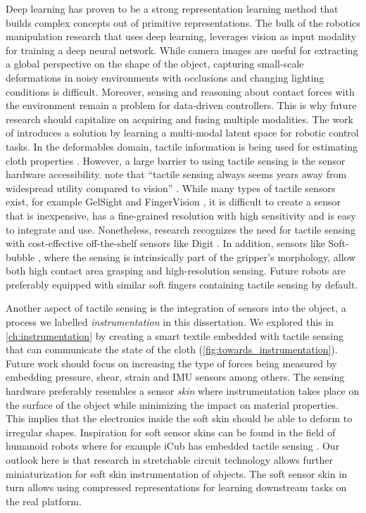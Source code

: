 \documentclass[\home/main.tex]{subfiles}
\begin{document}
Deep learning has proven to be a strong representation learning method that builds complex concepts out of primitive representations. The bulk of the robotics manipulation research that uses deep learning, leverages vision as input modality for training a deep neural network. While camera images are useful for extracting a global perspective on the shape of the object, capturing small-scale deformations in noisy environments with occlusions and changing lighting conditions is difficult. Moreover, sensing and reasoning about contact forces with the environment remain a problem for data-driven controllers. This is why future research should capitalize on acquiring and fusing multiple modalities. The work of \autocite{lee2020making} introduces a solution by learning a multi-modal latent space for robotic control tasks. In the deformables domain, tactile information is being used for estimating cloth properties \autocite{yuan2018active}. However, a large barrier to using tactile sensing is the sensor hardware accessibility. \citeauthor{Siciliano2008} note that \enquote{tactile sensing always seems years away from widespread utility compared to vision} \autocite{Siciliano2008}. While many types of tactile sensors exist, for example GelSight \autocite{donlon2018gelslim} and FingerVision \autocite{Yamaguchi2017}, it is difficult to create a sensor that is inexpensive, has a fine-grained resolution with high sensitivity and is easy to integrate and use. Nonetheless, research recognizes the need for tactile sensing with cost-effective off-the-shelf sensors like Digit \autocite{digit2020}. In addition, sensors like Soft-bubble \autocite{Alspach2019}, where the sensing is intrinsically part of the gripper's morphology, allow both high contact area grasping and high-resolution sensing. Future robots are preferably equipped with similar soft fingers containing tactile sensing by default.

Another aspect of tactile sensing is the integration of sensors into the object, a process we labelled \textit{instrumentation} in this dissertation.
We explored this in \cref{ch:instrumentation} by creating a smart textile embedded with tactile sensing that can communicate the state of the cloth (\cref{fig:towards_instrumentation}). Future work should focus on increasing the type of forces being measured by embedding pressure, shear, strain and IMU sensors among others. The sensing hardware preferably resembles a sensor \emph{skin} where instrumentation takes place on the surface of the object while minimizing the impact on material properties. This implies that the electronics inside the soft skin should be able to deform to irregular shapes. Inspiration for soft sensor skins can be found in the field of humanoid robots where for example iCub has embedded tactile sensing \autocite{Tomo2018}. Our outlook here is that research in stretchable circuit technology allows further miniaturization for soft skin instrumentation of objects. The soft sensor skin in turn allows using compressed representations for learning downstream tasks on the real platform.
\end{document}

